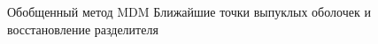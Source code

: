 \SPBGSectionSlide
  {Обобщенный метод MDM}
  {Ближайшие точки выпуклых оболочек и восстановление разделителя}
